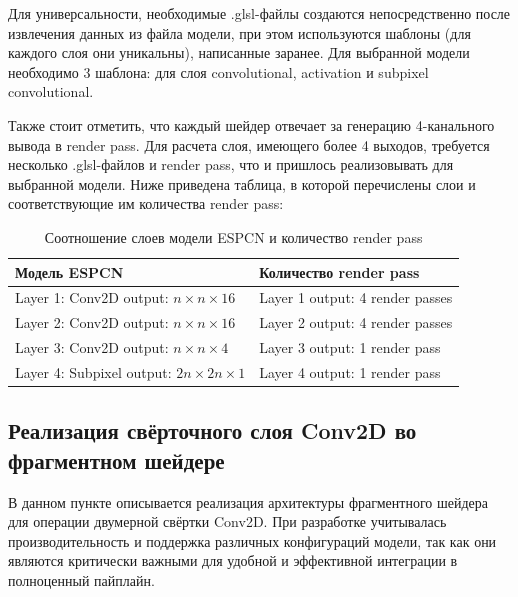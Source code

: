 \documentclass[a4paper,14pt]{extreport}
\begin{document}
            Для универсальности, необходимые .glsl-файлы создаются непосредственно после извлечения данных из файла модели, при этом используются шаблоны (для каждого слоя они уникальны), написанные заранее. Для выбранной модели необходимо 3 шаблона: для слоя convolutional, activation и subpixel convolutional.
            
            Также стоит отметить, что каждый шейдер отвечает за генерацию 4-канального вывода в render pass. Для расчета слоя, имеющего более 4 выходов, требуется несколько .glsl-файлов и render pass, что и пришлось реализовывать для выбранной модели. Ниже приведена таблица, в которой перечислены слои и соответствующие им количества render pass:

            \begin{table}[H]
                \caption{\label{tab:canonsummary}Соотношение слоев модели ESPCN и количество render pass}
                \begin{center}
                    \begin{tabular}{|l|l|}
                        \hline
                        Модель ESPCN & Количество render pass \\
                        \hline
                        Layer 1: Conv2D output: $n \times n \times 16$ & Layer 1 output: 4 render passes \\
                        \hline
                        Layer 2: Conv2D output: $n \times n \times 16$ & Layer 2 output: 4 render passes \\
                        \hline
                        Layer 3: Conv2D output: $n \times n \times 4$ & Layer 3 output: 1 render pass \\
                        \hline
                        Layer 4: Subpixel output: $2n \times 2n \times 1$ & Layer 4 output: 1 render pass \\
                        \hline
                    \end{tabular}
                \end{center}
            \end{table}
        
        \subsection{Реализация свёрточного слоя Conv2D во фрагментном шейдере}
            В данном пункте описывается реализация архитектуры фрагментного шейдера для операции двумерной свёртки Conv2D. При разработке учитывалась производительность и поддержка различных конфигураций модели, так как они являются критически важными для удобной и эффективной интеграции в полноценный пайплайн.
    
\end{document}
